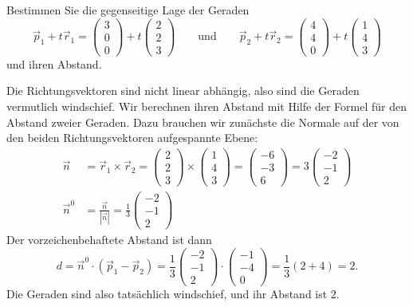 Bestimmen Sie die gegenseitige Lage der Geraden
\[
\vec p_1+t\vec r_1
=
\begin{pmatrix} 3\\ 0\\ 0 \end{pmatrix}
+t
\begin{pmatrix} 2\\ 2\\ 3 \end{pmatrix}
\qquad
\text{und}
\qquad
\vec p_2+t\vec r_2
=
\begin{pmatrix} 4\\ 4\\ 0 \end{pmatrix}
+t
\begin{pmatrix} 1\\ 4\\ 3 \end{pmatrix}
\]
und ihren Abstand.


\begin{loesung}
Die Richtungsvektoren sind nicht linear abhängig, also sind
die Geraden vermutlich windschief. Wir berechnen ihren Abstand mit
Hilfe der Formel für den Abstand zweier Geraden. Dazu brauchen
wir zunächste die Normale auf der von den beiden Richtungsvektoren
aufgespannte Ebene:
\begin{align*}
\vec n&=\vec r_1\times \vec r_2 =\begin{pmatrix} 2\\ 2\\ 3 \end{pmatrix}
\times
\begin{pmatrix} 1\\ 4\\ 3 \end{pmatrix}
=
\begin{pmatrix} -6\\-3\\6 \end{pmatrix}
=3
\begin{pmatrix} -2\\-1\\2 \end{pmatrix}
\\
\vec n^0&=\frac{\vec n}{|\vec n|}=
\frac13
\begin{pmatrix} -2\\-1\\2 \end{pmatrix}
\end{align*}
Der vorzeichenbehaftete Abstand ist dann
\[
d=\vec n^0\cdot(\vec p_1-\vec p_2)=
\frac13
\begin{pmatrix} -2\\-1\\2 \end{pmatrix}
\cdot
\begin{pmatrix} -1\\-4\\0\end{pmatrix}
=\frac13(2+4)=2.
\]
Die Geraden sind also tatsächlich windschief, und
ihr Abstand ist $2$.
\end{loesung}

